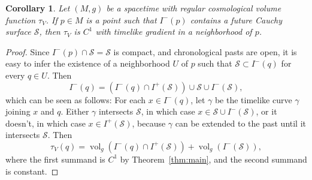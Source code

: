 \documentclass[10pt,a4paper]{amsart}
\newtheorem{corollary}{Corollary}
\newcommand{\CS}{\mathcal{S}}
\newcommand{\Vol}{\operatorname{vol}_g}
\begin{document}
\begin{corollary} \label{cor:2}
    Let $(M,g)$ be a spacetime with regular cosmological volume function $\tau_V$. If $p \in M$ is a point such that $I^-(p)$ contains a future Cauchy surface $\CS$, then $\tau_V$ is $C^1$ with timelike gradient in a neighborhood of $p$.
\end{corollary}

\begin{proof}
    Since $I^-(p) \cap \CS = \CS$ is compact, and chronological pasts are open, it is easy to infer the existence of a neighborhood $U$ of $p$ such that $\CS \subset I^-(q)$ for every $q \in U$. Then
    \begin{equation*}
        I^-(q) = \left(I^-(q) \cap I^+(\CS)\right) \cup \CS \cup I^-(\CS),
    \end{equation*}
    which can be seen as follows: For each $x \in I^-(q)$, let $\gamma$ be the timelike curve $\gamma$ joining $x$ and $q$. Either $\gamma$ intersects $\CS$, in which case $x \in \CS \cup I^-(\CS)$, or it doesn't, in which case $x \in I^+(\CS)$, because $\gamma$ can be extended to the past until it intersects $\CS$. Then
    \begin{equation*}
        \tau_V(q) = \Vol\left(I^-(q) \cap I^+(\CS)\right) + \Vol\left(I^-(\CS)\right),
    \end{equation*}
    where the first summand is $C^1$ by Theorem~\ref{thm:main}, and the second summand is constant.
\end{proof}
\end{document}
